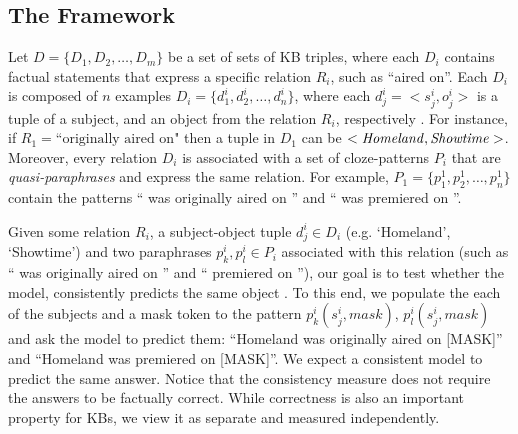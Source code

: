\subsection{The Framework}
\label{sec:framework}
Let
$D = \{D_1, D_2,
\dots, D_m\}$
be a set of sets of KB triples,
where each $D_i$ contains factual statements
that express a specific relation $R_i$, such as ``aired
on''. Each $D_i$ is composed of $n$ examples $D_i = \{d_1^i,
d_2^i, \dots, d_n^i\}$, where each $d_j^i = <s_j^i,o_j^i>$ is a tuple of a subject, and an object from the relation $R_i$, respectively . 
For instance, if $R_1=\text{``originally
  aired on"}$ then a tuple in $D_1$ can be $<\text{\textit{Homeland}}, \text{\textit{Showtime}}>$. Moreover, every relation $D_i$  is associated with a set of cloze-patterns $P_i$ that are \textit{quasi-paraphrases} and express the same relation. For example, $P_1=\{p_1^1, p_2^1, \dots, p_n^1\}$ contain the patterns ``\subj{} was originally aired on \obj{}'' and ``\subj{} was premiered on \obj{}''.

Given some relation $R_i$, a subject-object tuple $d_j^i \in D_i$ (e.g. `Homeland', `Showtime') and two paraphrases $p_k^i, p_l^i \in P_i$ associated with this relation (such as ``\subj{} was originally aired on \obj{}'' and ``\subj{} premiered on \obj{}''), our goal is to test whether the model, consistently predicts the same object . To this end, we populate the  each of the subjects and a mask token to the pattern $p_k^i(s_j^i,mask)$, $p_l^i(s_j^i,mask)$
and ask the model to predict  them: ``Homeland was originally aired on [MASK]'' and ``Homeland was premiered on [MASK]''.  We expect a consistent model to predict the same answer.  Notice that the consistency measure does not require the answers to be factually correct. While correctness is also an important property for KBs, we view it as separate and measured independently. 

